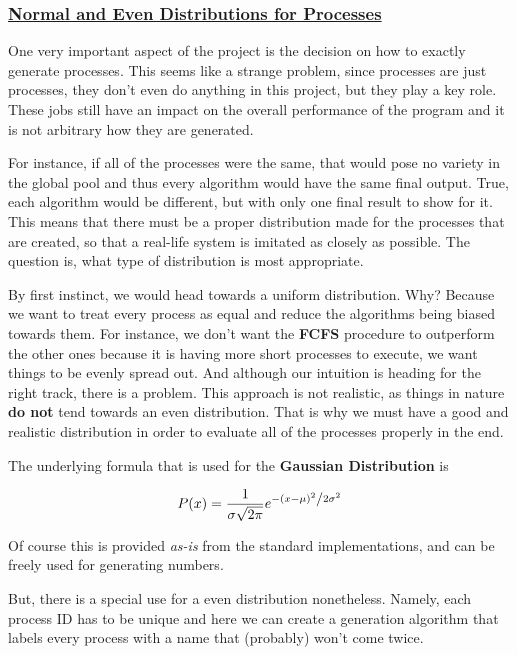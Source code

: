 \documentclass{article}
\newcommand{\code}[1]{\codeinline{\texttt{#1}}}
\begin{document}
\subsubsection{\underline{Normal and Even Distributions for Processes}}

One very important aspect of the project is the decision on how to exactly generate processes. This seems like a strange problem, since processes are just processes, they don't even do anything in this project, but they play a key role. These jobs still have an impact on the overall performance of the program and it is not arbitrary how they are generated.

For instance, if all of the processes were the same, that would pose no variety in the global pool and thus every algorithm would have the same final output. True, each algorithm would be different, but with only one final result to show for it. This means that there must be a proper distribution made for the processes that are created, so that a real-life system is imitated as closely as possible. The question is, what type of distribution is most appropriate.

By first instinct, we would head towards a uniform distribution. Why? Because we want to treat every process as equal and reduce the algorithms being biased towards them. For instance, we don't want the \textbf{FCFS} procedure to outperform the other ones because it is having more short processes to execute, we want things to be evenly spread out. And although our intuition is heading for the right track, there is a problem. This approach is not realistic, as things in nature \textbf{do not} tend towards an even distribution. That is why we must have a good and realistic distribution in order to evaluate all of the processes properly in the end.

The underlying formula that is used for the \textbf{Gaussian Distribution} is

\begin{equation}
P(x) = \frac{1}{{\sigma \sqrt {2\pi } }}e^{{{ - \left( {x - \mu } \right)^2 } \mathord{\left/ {\vphantom {{ - \left( {x - \mu } \right)^2 } {2\sigma ^2 }}} \right. \kern-\nulldelimiterspace} {2\sigma ^2 }}}
\end{equation}

Of course this is provided \textit{as-is} from the standard \code{C++} implementations, and can be freely used for generating numbers.

But, there is a special use for a even distribution nonetheless. Namely, each process ID has to be unique and here we can create a generation algorithm that labels every process with a name that (probably) won't come twice.
\end{document}
